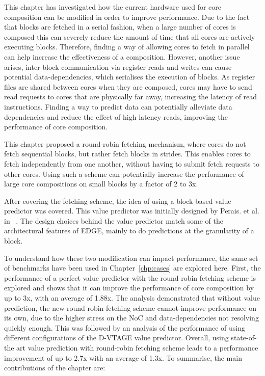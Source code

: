 This chapter has investigated how the current hardware used for core composition can be modified in order to improve performance.
Due to the fact that blocks are fetched in a serial fashion, when a large number of cores is composed this can severely reduce the amount of time that all cores are actively executing blocks.
Therefore, finding a way of allowing cores to fetch in parallel can help increase the effectiveness of a composition.
However, another issue arises, inter-block communication via register reads and writes can cause potential data-dependencies, which serialises the execution of blocks.
As register files are shared between cores when they are composed, cores may have to send read requests to cores that are physically far away, increasing the latency of read instructions.
Finding a way to predict data can potentially alleviate data dependencies and reduce the effect of high latency reads, improving the performance of core composition.

This chapter proposed a round-robin fetching mechanism, where cores do not fetch sequential blocks, but rather fetch blocks in strides.
This enables cores to fetch independently from one another, without having to submit fetch requests to other cores.
Using such a scheme can potentially increase the performance of large core compositions on small blocks by a factor of 2 to 3x.

After covering the fetching scheme, the idea of using a block-based value predictor was covered.
This value predictor was initially designed by Perais. et al. in ~\cite{peraisVTAGE2014, peraisBeBop2015}.
The design choices behind the value predictor match some of the architectural features of EDGE, mainly to do predictions at the granularity of a block.

To understand how these two modification can impact performance, the same set of benchmarks have been used in Chapter~\ref{chp:cases} are explored here.
First, the performance of a perfect value predictor with the round robin fetching scheme is explored and shows that it can improve the performance of core composition by up to 3x, with an average of 1.88x.
The analysis demonstrated that without value prediction, the new round robin fetching scheme cannot improve performance on its own, due to the higher stress on the NoC and data-dependencies not resolving quickly enough.
This was followed by an analysis of the performance of using different configurations of the D-VTAGE value predictor.
Overall, using state-of-the art value prediction with round-robin fetching scheme leads to a performance improvement of up to 2.7x with an average of 1.3x.
To summarise, the main contributions of the chapter are:

